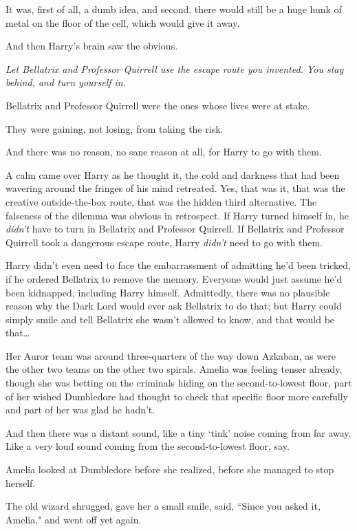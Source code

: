 It was, first of all, a dumb idea, and second, there would still be a huge hunk of metal on the floor of the cell, which would give it away.

And then Harry's brain saw the obvious.

\emph{Let Bellatrix and Professor Quirrell use the escape route you invented. You stay behind, and turn yourself in.}

Bellatrix and Professor Quirrell were the ones whose lives were at stake.

They were gaining, not losing, from taking the risk.

And there was no reason, no sane reason at all, for Harry to go with them.

A calm came over Harry as he thought it, the cold and darkness that had been wavering around the fringes of his mind retreated. Yes, that was it, that was the creative outside-the-box route, that was the hidden third alternative. The falseness of the dilemma was obvious in retrospect. If Harry turned himself in, he \emph{didn't} have to turn in Bellatrix and Professor Quirrell. If Bellatrix and Professor Quirrell took a dangerous escape route, Harry \emph{didn't} need to go with them.

Harry didn't even need to face the embarrassment of admitting he'd been tricked, if he ordered Bellatrix to remove the memory. Everyone would just assume he'd been kidnapped, including Harry himself. Admittedly, there was no plausible reason why the Dark Lord would ever ask Bellatrix to do that; but Harry could simply smile and tell Bellatrix she wasn't allowed to know, and that would be that{\ldots}

\later

Her Auror team was around three-quarters of the way down Azkaban, as were the other two teams on the other two spirals. Amelia was feeling tenser already, though she was betting on the criminals hiding on the second-to-lowest floor, part of her wished Dumbledore had thought to check that specific floor more carefully and part of her was glad he hadn't.

And then there was a distant sound, like a tiny `tink' noise coming from far away. Like a very loud sound coming from the second-to-lowest floor, say.

Amelia looked at Dumbledore before she realized, before she managed to stop herself.

The old wizard shrugged, gave her a small smile, said, ``Since you asked it, Amelia," and went off yet again.

